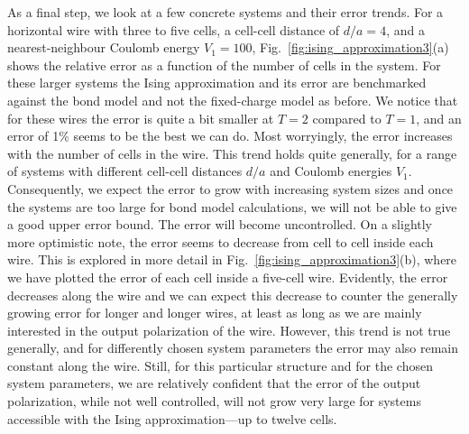 As a final step, we look at a few concrete systems and their error trends. For a
horizontal wire with three to five cells, a cell-cell distance of $d/a = 4$, and
a nearest-neighbour Coulomb energy $V_1 = 100$,
Fig.~\ref{fig:ising_approximation3}(a) shows the relative error as a function of
the number of cells in the system. For these larger systems the Ising
approximation and its error are benchmarked against the bond model and not the
fixed-charge model as before. We notice that for these wires the error is quite
a bit smaller at $T = 2$ compared to $T = 1$, and an error of 1\% seems to be
the best we can do. Most worryingly, the error increases with the number of
cells in the wire. This trend holds quite generally, for a range of systems with
different cell-cell distances $d/a$ and Coulomb energies $V_1$. Consequently, we
expect the error to grow with increasing system sizes and once the systems are
too large for bond model calculations, we will not be able to give a good upper
error bound. The error will become uncontrolled. On a slightly more optimistic
note, the error seems to decrease from cell to cell inside each wire. This is
explored in more detail in Fig.~\ref{fig:ising_approximation3}(b), where we have
plotted the error of each cell inside a five-cell wire. Evidently, the error
decreases along the wire and we can expect this decrease to counter the
generally growing error for longer and longer wires, at least as long as we are
mainly interested in the output polarization of the wire. However, this trend is
not true generally, and for differently chosen system parameters the error may
also remain constant along the wire. Still, for this particular 
structure and for the chosen system parameters, we are relatively confident that
the error of the output polarization, while not well controlled, will not grow
very large for systems accessible with the Ising approximation---up to twelve
 cells. 
%
